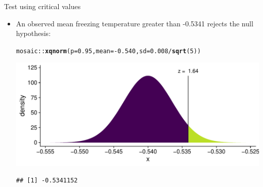 \documentclass[10pt]{beamer}\usepackage[]{graphicx}\usepackage[]{color}
\makeatletter
\def\maxwidth{ %
  \ifdim\Gin@nat@width>\linewidth
    \linewidth
  \else
    \Gin@nat@width
  \fi
}
\newcommand{\hlnum}[1]{\textcolor[rgb]{0.686,0.059,0.569}{#1}}%
\newcommand{\hlopt}[1]{\textcolor[rgb]{0,0,0}{#1}}%
\newcommand{\hlstd}[1]{\textcolor[rgb]{0.345,0.345,0.345}{#1}}%
\newcommand{\hlkwc}[1]{\textcolor[rgb]{0.333,0.667,0.333}{#1}}%
\newcommand{\hlkwd}[1]{\textcolor[rgb]{0.737,0.353,0.396}{\textbf{#1}}}%
\newenvironment{kframe}{%
 \def\at@end@of@kframe{}%
 \ifinner\ifhmode%
  \def\at@end@of@kframe{\end{minipage}}%
  \begin{minipage}{\columnwidth}%
 \fi\fi%
 \def\FrameCommand##1{\hskip\@totalleftmargin \hskip-\fboxsep
 \colorbox{shadecolor}{##1}\hskip-\fboxsep
     \hskip-\linewidth \hskip-\@totalleftmargin \hskip\columnwidth}%
 \MakeFramed {\advance\hsize-\width
   \@totalleftmargin\z@ \linewidth\hsize
   \@setminipage}}%
 {\par\unskip\endMakeFramed%
 \at@end@of@kframe}
\newenvironment{knitrout}{}{} %
\makeatother
\begin{document}
\begin{frame}[fragile]{Test using critical values}
	\begin{itemize}
		
		\item An observed mean freezing temperature greater than -0.5341 rejects the null hypothesis:
		
\begin{knitrout}\tiny
{}\color{fgcolor}\begin{kframe}
\begin{alltt}
\hlstd{mosaic}\hlopt{::}\hlkwd{xqnorm}\hlstd{(}\hlkwc{p} \hlstd{=} \hlnum{0.95}\hlstd{,} \hlkwc{mean} \hlstd{=} \hlopt{-}\hlnum{0.540}\hlstd{,} \hlkwc{sd} \hlstd{=} \hlnum{0.008}\hlopt{/}\hlkwd{sqrt}\hlstd{(}\hlnum{5}\hlstd{))}
\end{alltt}


{\ttfamily\noindent\itshape\color{messagecolor}{\#\# }}

{\ttfamily\noindent\itshape{}}

{\ttfamily\noindent\itshape\color{messagecolor}{\#\# 	P(X <= -0.5341152) = 0.95}}

{\ttfamily\noindent\itshape\color{messagecolor}{\#\# 	P(X > \ -0.5341152) = 0.05}}

{\ttfamily\noindent\itshape\color{messagecolor}{\#\# }}\end{kframe}

{\centering \includegraphics[width=\maxwidth]{figure/unnamed-chunk-4-1} 

}


\begin{kframe}\begin{verbatim}
## [1] -0.5341152
\end{verbatim}
\end{kframe}
\end{knitrout}
		
		
	\end{itemize}
\end{frame}
\end{document}
